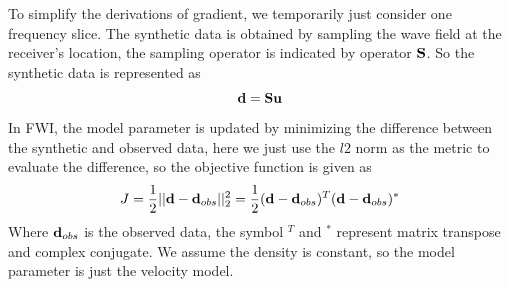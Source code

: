 \documentclass[revised,endfloat]{geophysics}
\begin{document}
To simplify the derivations of gradient, we temporarily just consider one frequency slice. The synthetic data is obtained by sampling the wave field at the receiver's location, the sampling operator is indicated by operator ${\bf S}$. So the synthetic data is represented as 
\begin{equation}
{\bf d = Su}
\label{eq126}
\end{equation}
In FWI, the model parameter is updated by minimizing the difference between the synthetic and observed data, here we just use the $l2$ norm as the metric to evaluate the difference, so the objective function is given as 
\begin{equation}
J = \frac{1}{2}||{\bf d} - {\bf d}_{obs}||_2^2 = \frac{1}{2}({\bf d} - {\bf d}_{obs})^T ({\bf d} - {\bf d}_{obs})^*
\label{eq127}
\end{equation}
Where ${\bf d}_{obs}$ is the observed data, the symbol $^T$ and $^*$ represent matrix transpose and complex conjugate. We assume the density is constant, so the model parameter is just the velocity model.
\end{document}

